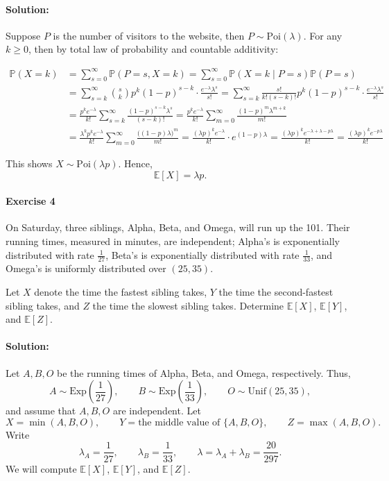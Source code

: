 \documentclass[a4paper,12pt]{article}
\newcommand{\mb}[1]{\mathbb{#1}}
\begin{document}
\paragraph{Solution:} Suppose \(P\) is the number of visitors to the website, then \(P \sim \mathrm{Poi}(\lambda) \). For any \(k \ge 0\), then by total law of probability and countable additivity:

\begin{align*}
\mathbb{P}(X=k) &= \sum_{s=0}^{\infty} \mathbb{P}(P=s, X=k) = \sum_{s=0}^{\infty} \mathbb{P}(X=k \mid P=s) \mathbb{P}(P=s) \\
&= \sum_{s=k}^{\infty} \binom{s}{k} p^k (1-p)^{s-k} \cdot \frac{e^{-\lambda} \lambda^s}{s!} = \sum_{s=k}^{\infty} \frac{s!}{k!(s-k)!} p^k (1-p)^{s-k} \cdot \frac{e^{-\lambda} \lambda^s}{s!} \\
&= \frac{p^k e^{-\lambda}}{k!} \sum_{s=k}^{\infty} \frac{(1-p)^{s-k} \lambda^s}{(s-k)!} = \frac{p^k e^{-\lambda}}{k!} \sum_{m=0}^{\infty} \frac{(1-p)^m \lambda^{m+k}}{m!} \\
&= \frac{\lambda^k p^k e^{-\lambda}}{k!} \sum_{m=0}^{\infty} \frac{\big((1-p)\lambda\big)^m}{m!} = \frac{(\lambda p)^k e^{-\lambda}}{k!} \cdot e^{(1-p)\lambda} = \frac{(\lambda p)^k e^{-\lambda + \lambda - p\lambda}}{k!} = \frac{(\lambda p)^k e^{-p\lambda}}{k!}
\end{align*}

This shows \(X \sim \mathrm{Poi}(\lambda p) \). Hence,
\[
    \mathbb{E} [X] = \lambda p.
\]  

\paragraph{Exercise 4} On Saturday, three siblings, Alpha, Beta, and Omega, will run up the 101. Their running times, measured in minutes, are independent; Alpha's is exponentially distributed with rate $\frac{1}{27}$, Beta's is exponentially distributed with rate $\frac{1}{33}$, and Omega's is uniformly distributed over $(25, 35)$.

Let $X$ denote the time the fastest sibling takes, $Y$ the time the second-fastest sibling takes, and $Z$ the time the slowest sibling takes. Determine $\mb{E}[X]$, $\mb{E}[Y]$, and $\mb{E}[Z]$.

\paragraph{Solution:}
Let \(A, B, O\) be the running times of Alpha, Beta, and Omega, respectively. Thus, 
\[
A\sim \mathrm{Exp}\!\left(\frac1{27}\right),\qquad
B\sim \mathrm{Exp}\!\left(\frac1{33}\right),\qquad
O\sim \mathrm{Unif}(25,35),
\]
and assume that $A,B,O$ are independent.  Let
\[
X=\min(A,B,O),\qquad
Y=\text{the middle value of } \{A,B,O\},\qquad
Z=\max(A,B,O).
\]
Write
\[
\lambda_A=\frac1{27},\qquad
\lambda_B=\frac1{33},\qquad
\lambda=\lambda_A+\lambda_B=\frac{20}{297}.
\]
We will compute $\mathbb E[X]$, $\mathbb E[Y]$, and $\mathbb E[Z]$.
\end{document}
